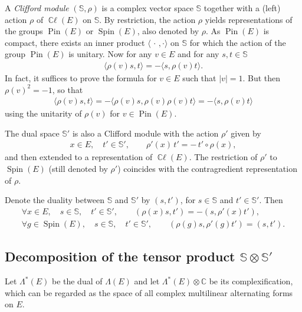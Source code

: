 \documentclass[pdftex]{sigma}
\DeclareMathOperator{\ccl}{\mathbb{C}\ell} %
\DeclareMathOperator{\Spin}{Spin}
\DeclareMathOperator{\Pin}{Pin}
\numberwithin{equation}{section}
\begin{document}
A \emph{Clifford module} $(\mathbb S, \rho)$ is a complex vector space $\mathbb S$ together with a (left) action $\rho$ of $\ccl(E)$ on $\mathbb S$. By restriction, the action $\rho$ yields representations of the groups $\Pin(E)$ or $\Spin(E)$, also denoted by $\rho$. As $\Pin(E)$ is compact, there exists an inner product $\langle\,\cdot \,,\cdot\rangle$ on $\mathbb S$ for which the action of the group $\Pin(E)$ is unitary. Now for any $v\in E$ and for any $s,t\in \mathbb S$
\begin{gather*}\label{rho(v)}
\langle \rho(v)s, t\rangle= - \langle s, \rho(v)t\rangle .
\end{gather*}
In fact, it suffices to prove the formula for $v\in E$ such that $\vert v\vert =1$. But then $\rho(v)^2 = -1$, so that
\begin{gather*}
\langle \rho(v)s, t\rangle=-\langle \rho(v)s, \rho(v) \rho(v) t\rangle= - \langle s, \rho(v)t\rangle
\end{gather*}
using the unitarity of $\rho(v)$ for $v\in \Pin(E)$.


The dual space $\mathbb S'$ is also a Clifford module with the action $\rho'$ given by
\begin{gather*}
x\in E,\quad t'\in \mathbb S',\qquad \rho'(x)\, t'= -\,t'\circ \rho(x),
\end{gather*}
and then extended to a representation of $\ccl(E)$. The restriction of $\rho'$ to $\Spin(E)$ (still denoted by $\rho'$) coincides with the contragredient representation of $\rho$.

 Denote the duality between $\mathbb S$ and $\mathbb S'$ by $(s, t')$, for $s\in \mathbb S$ and $t'\in \mathbb S'$. Then
\begin{gather}
\forall x\in E,\quad s\in \mathbb S,\quad t'\in\mathbb S', \qquad (\rho(x) s,t') = -(s,\rho'(x)t'),\nonumber
\\[.5ex]
\forall g\in \Spin(E),\quad s\in \mathbb S,\quad t'\in\mathbb S',\qquad (\rho(g) s,\rho'(g)t') = (s,t').\label{1rhorho'1}
\end{gather}

\subsection[Decomposition of the tensor product SxS']
{Decomposition of the tensor product $\boldsymbol{\mathbb S\otimes \mathbb S'}$}

 Let $\Lambda^*(E)$ be the dual of $\Lambda(E)$ and let $\Lambda^*(E)\otimes \mathbb C$ be its complexification, which can be regarded as the space of all complex multilinear alternating forms on $E$.
\end{document}
